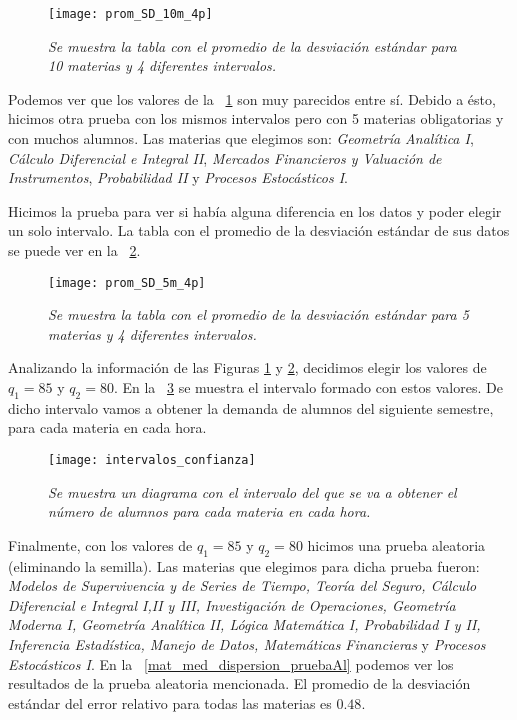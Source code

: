 \begin{figure}[h]
\centering
\texttt{[image: prom\_SD\_10m\_4p]} %
\caption[\textit{Promedio de la desviación estándar: 10 materias, 4 intervalos}]{\textit{Se muestra la tabla con el promedio de la desviación estándar para 10 materias y 4 diferentes intervalos.}}\label{promSD_10m_4p}
\end{figure}

Podemos ver que los valores de la \figurename{~\ref{promSD_10m_4p}} son muy parecidos entre sí. Debido a ésto, hicimos otra prueba con los mismos intervalos pero con 5 materias obligatorias y con muchos alumnos. Las materias que elegimos son: \textit{Geometría Analítica I}, \textit{Cálculo Diferencial e Integral II}, \textit{Mercados Financieros y Valuación de Instrumentos}, \textit{Probabilidad II} y \textit{Procesos Estocásticos I}.

Hicimos la prueba para ver si había alguna diferencia en los datos y poder elegir un solo intervalo. La tabla con el promedio de la desviación estándar de sus datos se puede ver en la \figurename{~\ref{promSD_5m_4p}}.


\begin{figure}[H]
\centering
\texttt{[image: prom\_SD\_5m\_4p]} %
\caption[\textit{Promedio de la desviación estándar: 5 materias, 4 intervalos}]{\textit{Se muestra la tabla con el promedio de la desviación estándar para 5 materias y 4 diferentes intervalos.}}\label{promSD_5m_4p}
\end{figure}

Analizando la información de las Figuras \ref{promSD_10m_4p} y \ref{promSD_5m_4p}, decidimos elegir los valores de $q_{1} = 85$ y $q_{2} = 80$. En la \figurename{~\ref{interConf}} se muestra el intervalo formado con estos valores. De dicho intervalo vamos a obtener la demanda de alumnos del siguiente semestre, para cada materia en cada hora.

\begin{figure}[H]
\centering
\texttt{[image: intervalos\_confianza]} %
\caption[\textit{Diagrama de los intervalos de confianza}]{\textit{Se muestra un diagrama con el intervalo del que se va a obtener el número de alumnos para cada materia en cada hora.}}\label{interConf}
\end{figure}

Finalmente, con los valores de $q_{1} = 85$ y $q_{2} = 80$ hicimos una prueba aleatoria (eliminando la semilla). Las materias que elegimos para dicha prueba fueron: \textit{Modelos de Supervivencia y de Series de Tiempo, Teoría del Seguro, Cálculo Diferencial e Integral I,II y III, Investigación de Operaciones, Geometría Moderna I, Geometría Analítica II, Lógica Matemática I, Probabilidad I y II, Inferencia Estadística, Manejo de Datos, Matemáticas Financieras} y \textit{Procesos Estocásticos I}. En la \figurename{~\ref{mat_med_dispersion_pruebaAl}} podemos ver los resultados de la prueba aleatoria mencionada. El promedio de la desviación estándar del error relativo para todas las materias es $0.48$.%

